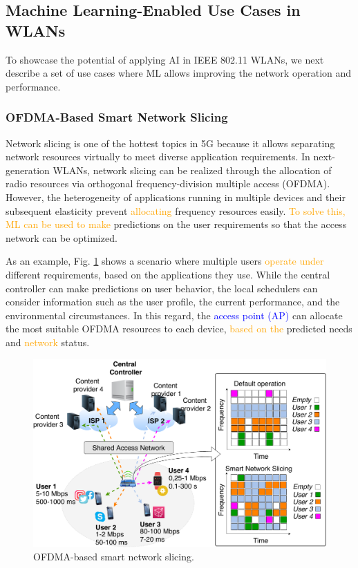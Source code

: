\documentclass[journal]{IEEEtran}
\begin{document}
\subsection{Machine Learning-Enabled Use Cases in WLANs}
To showcase the potential of applying AI in IEEE 802.11 WLANs, we next describe a set of use cases where ML allows improving the network operation and performance.

\subsubsection{OFDMA-Based Smart Network Slicing} 
Network slicing is one of the hottest topics in 5G because it allows separating network resources virtually to meet diverse application requirements. In next-generation WLANs, network slicing can be realized through the allocation of radio resources via orthogonal frequency-division multiple access (OFDMA). However, the heterogeneity of applications running in multiple devices and their subsequent elasticity prevent \textcolor{orange}{allocating} frequency resources easily. \textcolor{orange}{To solve this, ML can be used to make} predictions on the user requirements so that the access network can be optimized.

As an example, Fig. \ref{fig:use_cases} shows a scenario where multiple users \textcolor{orange}{operate under} different requirements, based on the applications they use. While the central controller can make predictions on user behavior, the local schedulers can consider information such as the user profile, the current performance, and the environmental circumstances. In this regard, the \textcolor{blue}{access point (AP)} can allocate the most suitable OFDMA resources to each device, \textcolor{orange}{based on the} predicted needs and \textcolor{orange}{network} status.

\begin{figure}[ht!]
	\centering
	\includegraphics[width=1\columnwidth]{network_slicing_ofdma}
	\caption{OFDMA-based smart network slicing.}
	\label{fig:use_cases}
\end{figure}
\end{document}
